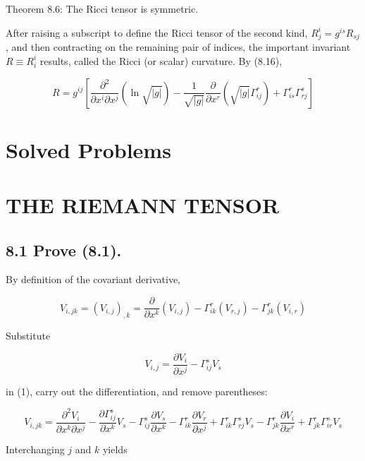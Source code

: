 \documentclass[10pt]{article}
\begin{document}
Theorem 8.6: The Ricci tensor is symmetric.

After raising a subscript to define the Ricci tensor of the second kind, $R_{j}^{i}=g^{i s} R_{s j}$, and then contracting on the remaining pair of indices, the important invariant $R \equiv R_{i}^{i}$ results, called the Ricci (or scalar) curvature. By (8.16),


\begin{equation*}
R=g^{i j}\left[\frac{\partial^{2}}{\partial x^{i} \partial x^{j}}(\ln \sqrt{|g|})-\frac{1}{\sqrt{|g|}} \frac{\partial}{\partial x^{r}}\left(\sqrt{|g|} \Gamma_{i j}^{r}\right)+\Gamma_{i s}^{r} \Gamma_{r j}^{s}\right] \tag{8.17}
\end{equation*}


\section*{Solved Problems}
\section*{THE RIEMANN TENSOR}
\subsection*{8.1 Prove (8.1).}
By definition of the covariant derivative,


\begin{equation*}
V_{i, j k}=\left(V_{i, j}\right)_{, k}=\frac{\partial}{\partial x^{k}}\left(V_{i, j}\right)-\Gamma_{i k}^{r}\left(V_{r, j}\right)-\Gamma_{j k}^{r}\left(V_{i, r}\right) \tag{1}
\end{equation*}


Substitute

$$
V_{i, j}=\frac{\partial V_{i}}{\partial x^{j}}-\Gamma_{i j}^{s} V_{s}
$$

in (1), carry out the differentiation, and remove parentheses:


\begin{equation*}
V_{i, j k}=\frac{\partial^{2} V_{i}}{\partial x^{k} \partial x^{j}}-\frac{\partial \Gamma_{i j}^{s}}{\partial x^{k}} V_{s}-\Gamma_{i j}^{s} \frac{\partial V_{s}}{\partial x^{k}}-\Gamma_{i k}^{r} \frac{\partial V_{r}}{\partial x^{j}}+\Gamma_{i k}^{r} \Gamma_{r j}^{s} V_{s}-\Gamma_{j k}^{r} \frac{\partial V_{i}}{\partial x^{r}}+\Gamma_{j k}^{r} \Gamma_{i r}^{s} V_{s} \tag{2}
\end{equation*}


Interchanging $j$ and $k$ yields
\end{document}
